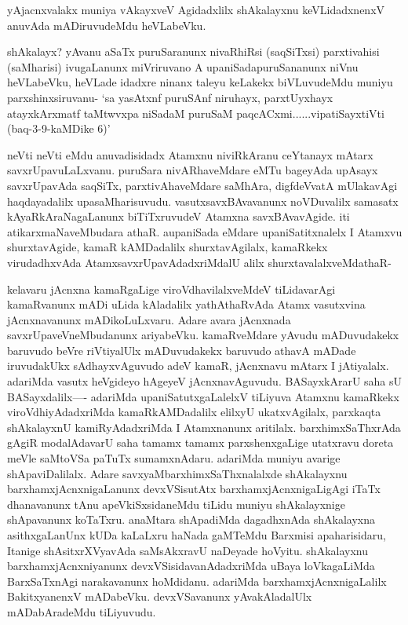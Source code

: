 \begin{artha}
yAjacnxvalakx muniya vAkayxveV Agidadxlilx shAkalayxnu keVLidadxnenxV anuvAda mADiruvudeMdu heVLabeVku. 
\end{artha}


\begin{artha}
shAkalayx? yAvanu aSaTx puruSaranunx nivaRhiRsi (saqSiTxsi) parxtivahisi (saMharisi) ivugaLanunx miVriruvano A upaniSadapuruSananunx niVnu heVLabeVku, heVLade idadxre ninanx taleyu keLakekx biVLuvudeMdu muniyu parxshinxsiruvanu- `sa yasAtxnf puruSAnf niruhayx, parxtUyxhayx atayxkArxmatf taMtwvxpa niSadaM puruSaM paqcACxmi......vipatiSayxtiVti (baq-3-9-kaMDike 6)'
\end{artha}

\begin{artha}
neVti neVti eMdu anuvadisidadx Atamxnu niviRkAranu ceYtanayx mAtarx savxrUpavuLaLxvanu. puruSara nivARhaveMdare eMTu bageyAda upAsayx savxrUpavAda saqSiTx, parxtivAhaveMdare saMhAra, digfdeVvatA mUlakavAgi haqdayadalilx upasaMharisuvudu. vasutxsavxBAvavanunx noVDuvalilx samasatx kAyaRkAraNagaLanunx biTiTxruvudeV Atamxna savxBAvavAgide. iti atikarxmaNaveMbudara athaR. aupaniSada eMdare upaniSatitxnalelx I Atamxvu shurxtavAgide, kamaR kAMDadalilx shurxtavAgilalx, kamaRkekx virudadhxvAda AtamxsavxrUpavAdadxriMdalU alilx shurxtavalalxveMdathaR-
\end{artha}


\begin{artha}
kelavaru jAcnxna kamaRgaLige viroVdhavilalxveMdeV tiLidavarAgi kamaRvanunx mADi uLida kAladalilx yathAthaRvAda Atamx vasutxvina jAcnxnavanunx mADikoLuLxvaru. Adare avara jAcnxnada savxrUpaveVneMbudanunx ariyabeVku. kamaRveMdare yAvudu mADuvudakekx baruvudo beVre riVtiyalUlx mADuvudakekx baruvudo athavA mADade iruvudakUkx sAdhayxvAguvudo adeV kamaR, jAcnxnavu mAtarx I jAtiyalalx. adariMda vasutx heVgideyo hAgeyeV jAcnxnavAguvudu. BASayxkArarU saha sU BASayxdalilx---- adariMda upaniSatutxgaLalelxV tiLiyuva Atamxnu kamaRkekx viroVdhiyAdadxriMda kamaRkAMDadalilx elilxyU ukatxvAgilalx, parxkaqta  shAkalayxnU kamiRyAdadxriMda I Atamxnanunx aritilalx. barxhimxSaThxrAda gAgiR modalAdavarU saha tamamx tamamx parxshenxgaLige utatxravu doreta meVle saMtoVSa paTuTx sumamxnAdaru. adariMda muniyu avarige shApaviDalilalx. Adare savxyaMbarxhimxSaThxnalalxde shAkalayxnu barxhamxjAcnxnigaLanunx devxVSisutAtx barxhamxjAcnxnigaLigAgi iTaTx dhanavanunx tAnu apeVkiSxsidaneMdu tiLidu muniyu shAkalayxnige shApavanunx koTaTxru. anaMtara shApadiMda dagadhxnAda shAkalayxna asithxgaLanUnx kUDa kaLaLxru haNada gaMTeMdu Barxmisi apaharisidaru, Itanige shAsitxrXVyavAda saMsAkxravU naDeyade hoVyitu. shAkalayxnu barxhamxjAcnxniyanunx devxVSisidavanAdadxriMda uBaya loVkagaLiMda BarxSaTxnAgi narakavanunx hoMdidanu. adariMda barxhamxjAcnxnigaLalilx BakitxyanenxV mADabeVku. devxVSavanunx yAvakAladalUlx mADabAradeMdu tiLiyuvudu. 
\end{artha}%

